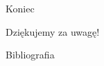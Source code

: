 
\begin{frame}{Koniec}
    \begin{center}
        {\huge Dziękujemy za uwagę!}
    \end{center}
\end{frame}

\begin{frame}[allowframebreaks]{Bibliografia}
    \printbibliography
\end{frame}

\pglastframe